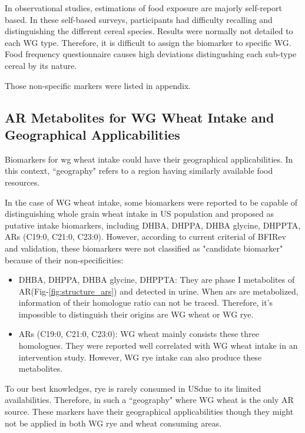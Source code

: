In observational studies, estimations of food exposure are majorly self-report based. 
In these self-based surveys, participants had difficulty recalling and distinguishing the different cereal species. Results were normally not detailed to each WG type.
Therefore, it is difficult to assign the biomarker to specific WG. 
Food frequency questionnaire causes high deviations distingushing each sub-type cereal by its nature.

Those non-specific markers were listed in appendix. 

\subsection{AR Metabolites for WG Wheat Intake and Geographical Applicabilities}
Biomarkers for \acrshort{wg} wheat intake could have their geographical applicabilities. In this context, ``geography" refers to a region having similarly available food resources.

In the case of WG wheat intake, some biomarkers were reported to be capable of distinguishing whole grain wheat intake in US population and proposed as putative intake biomarkers, including DHBA, DHPPA, DHBA glycine, DHPPTA\cite{ISI:000330080500002}, ARs (C19:0, C21:0, C23:0)\cite{ISI:000374112900032}. However, according to current criterial of BFIRev\cite{Pratico2018} and validation\cite{LarsValidation}, these biomarkers were not classified as "candidate biomarker" because of their non-specificities:
\begin{itemize}
	\item DHBA, DHPPA, DHBA glycine, DHPPTA: They are phase I metabolites of AR(Fig-\ref{fig:structure_ars}) and detected in urine. When \acrshort{ars} are metabolized, information of their homologue ratio can not be traced. Therefore, it's impossible to distinguish their origins are WG wheat or WG rye.
	\item ARs (C19:0, C21:0, C23:0): WG wheat mainly consists these three homologues. They were reported well correlated with WG wheat intake in an intervention study\cite{ISI:000374112900032}. However, WG rye intake can also produce these metabolites.
\end{itemize}

To our best knowledges, rye is rarely consumed in USdue to its limited availabilities. Therefore, in such a ``geography" where WG wheat is the only AR source. These markers have their geographical applicabilities though they might not be applied in both WG rye and wheat consuming areas. 

